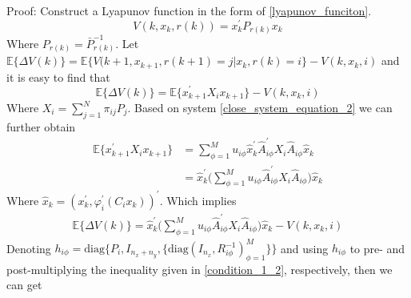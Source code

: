 \documentclass[conference]{IEEEtran}
\begin{document}
Proof: Construct a Lyapunov function in the form of \eqref{lyapunov_funciton}.
\begin{equation}\label{lyapunov_funciton} 
	V(k,x_k,r(k))=x^{'}_{k}P_{r(k)}x_{k}
\end{equation}
Where $P_{r(k)}=\bar{P}^{-1}_{r(k)}$. Let $\mathbb{E}\{\varDelta V(k)\}=\mathbb{E}\{V(k+1,x_{k+1},r(k+1)=j|x_k,r(k)=i \}-V(k,x_k,i)$ and it is easy to find that
\begin{equation} \label{lypfunction}
	\mathbb{E}\{\varDelta V(k)\}=\mathbb{E}\{x^{'}_{k+1}X_{i} x_{k+1} \}-V(k,x_k,i)
\end{equation} 
Where $X_{i} = \sum_{j=1}^{N}\pi_{ij}P_{j}$. Based on system \eqref{close_system_equation_2} we can further obtain \\
\begin{equation}
	\begin{split}
		\mathbb{E}\{x^{'}_{k+1}X_{i} x_{k+1} \}& = \sum_{\phi=1}^{M} u_{i\phi} \hat{x}^{'}_{k} \hat{A}^{'}_{i\phi}X_{i}\hat{A}_{i\phi}\hat{x}_{k}\\
		&=\hat{x}^{'}_{k} \Big( \sum_{\phi=1}^{M}u_{i\phi}\hat{A}^{'}_{i\phi}X_{i}\hat{A}_{i\phi}\Big) \hat{x}_{k} 
	\end{split}
\end{equation}
Where $\hat{x}_{k}=(x^{'}_k,\varphi^{'}_{i}(C_{i}x_{k}))^{'}$. Which implies
\begin{equation} \label{leq18}
	\begin{split}
		\mathbb{E}\{\varDelta V(k)\}=\hat{x}^{'}_{k} \Big( \sum_{\phi=1}^{M}u_{i\phi}\hat{A}^{'}_{i\phi}X_{i}\hat{A}_{i\phi}\Big) \hat{x}_{k} -V(k,x_k,i)
	\end{split}
\end{equation}
Denoting $h_{i\phi} = \mathrm{diag}\{P_{i}, I_{n_x+n_y},\{\mathrm{diag}(I_{n_x},R^{-1}_{i\phi})^{M}_{\phi=1} \} \}$ and using $h_{i\phi}$ to pre- and post-multiplying the inequality given in \eqref{condition_1_2}, respectively, then we can get \\
\end{document}
